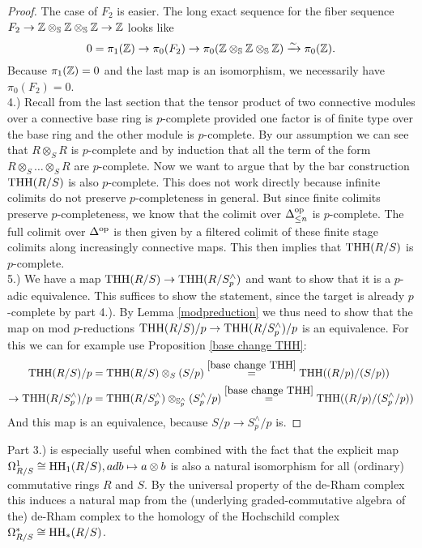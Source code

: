 \begin{proof}
    The case of $F_2$ is easier. The long exact sequence for the fiber sequence $F_2\to \mathbb{Z}\otimes_{\mathbb{S}}\mathbb{Z}\otimes_{\mathbb{S}}\mathbb{Z}\to \mathbb{Z}$ looks like 
    \begin{equation*}
        0=\pi_1(\mathbb{Z})\to \pi_0(F_2)\to \pi_0(\mathbb{Z}\otimes_{\mathbb{S}}\mathbb{Z}\otimes_{\mathbb{S}}\mathbb{Z})\xrightarrow{\sim} \pi_0(\mathbb{Z}).
    \end{equation*}
    Because $\pi_1(\mathbb{Z})=0$ and the last map is an isomorphism, we necessarily have $\pi_0(F_2)=0$. \\
    4.) Recall from the last section that the tensor product of two connective modules over a connective base ring is $p$-complete provided one factor is of finite type over the base ring and the other module is $p$-complete. By our assumption we can see that $R\otimes_S R$ is $p$-complete and by induction that all the term of the form $R\otimes_S \dots \otimes_S R$ are $p$-complete. Now we want to argue that by the bar construction $\operatorname{THH}(R/S)$ is also $p$-complete. This does not work directly because infinite colimits do not preserve $p$-completeness in general. But since finite colimits preserve $p$-completeness, we know that the colimit over $\Delta^{\operatorname{op}}_{\leq n}$ is $p$-complete. The full colimit over $\Delta^{\operatorname{op}}$ is then given by a filtered colimit of these finite stage colimits along increasingly connective maps. This then implies that $\operatorname{THH}(R/S)$ is $p$-complete. \\
    5.) We have a map $\operatorname{THH}(R/S)\to \operatorname{THH}(R/S_p^{\wedge})$ and want to show that it is a $p$-adic equivalence. This suffices to show the statement, since the target is already $p$-complete by part 4.). 
    By Lemma \ref{modpreduction} we thus need to show that the map on mod $p$-reductions $\operatorname{THH}(R/S)/p\to \operatorname{THH}(R/S_p^{\wedge})/p$ is an equivalence. For this we can for example use Proposition \ref{base change THH}:
    \begin{align*}
        \operatorname{THH}(R/S)/p&=\operatorname{THH}(R/S)\otimes_S(S/p)\stackrel{\ref{base change THH}}{=}\operatorname{THH}((R/p)/(S/p))\\
        \to \operatorname{THH}(R/S_p^{\wedge})/p&=\operatorname{THH}(R/S_p^{\wedge})\otimes_{\mathbb{S}_p^{\wedge}}(S_p^{\wedge}/p) \stackrel{\ref{base change THH}}{=}\operatorname{THH}((R/p)/(S^{\wedge}_p/p))
    \end{align*}
    And this map is an equivalence, because $S/p\to S_p^{\wedge}/p$ is.
\end{proof}
Part 3.) is especially useful when combined with the fact that the explicit map $\Omega^1_{R/S} \cong \operatorname{HH}_1(R/S), adb\mapsto a\otimes b$ is also a natural isomorphism for all (ordinary) commutative rings $R$ and $S$. By the universal property of the de-Rham complex this induces a natural map from the (underlying graded-commutative algebra of the) de-Rham complex to the homology of the Hochschild complex $\Omega^{*}_{R/S} \cong \operatorname{HH}_*(R/S)$. 
